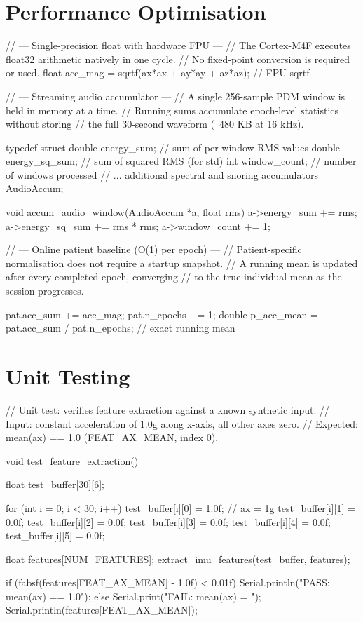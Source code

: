 \section{Performance Optimisation}
\label{app:optimisation}

\begin{ccode}
// --- Single-precision float with hardware FPU ---
// The Cortex-M4F executes float32 arithmetic natively in one cycle.
// No fixed-point conversion is required or used.
float acc_mag = sqrtf(ax*ax + ay*ay + az*az);   // FPU sqrtf

// --- Streaming audio accumulator ---
// A single 256-sample PDM window is held in memory at a time.
// Running sums accumulate epoch-level statistics without storing
// the full 30-second waveform (~480 KB at 16 kHz).

typedef struct {
    double energy_sum;     // sum of per-window RMS values
    double energy_sq_sum;  // sum of squared RMS (for std)
    int    window_count;   // number of windows processed
    // ... additional spectral and snoring accumulators
} AudioAccum;

void accum_audio_window(AudioAccum *a, float rms) {
    a->energy_sum    += rms;
    a->energy_sq_sum += rms * rms;
    a->window_count  += 1;
}

// --- Online patient baseline (O(1) per epoch) ---
// Patient-specific normalisation does not require a startup snapshot.
// A running mean is updated after every completed epoch, converging
// to the true individual mean as the session progresses.

pat.acc_sum  += acc_mag;
pat.n_epochs += 1;
double p_acc_mean = pat.acc_sum / pat.n_epochs;   // exact running mean
\end{ccode}


\section{Unit Testing}
\label{app:testing}

\begin{ccode}
// Unit test: verifies feature extraction against a known synthetic input.
// Input: constant acceleration of 1.0g along x-axis, all other axes zero.
// Expected: mean(ax) == 1.0 (FEAT_AX_MEAN, index 0).

void test_feature_extraction() {
    float test_buffer[30][6];

    for (int i = 0; i < 30; i++) {
        test_buffer[i][0] = 1.0f;   // ax = 1g
        test_buffer[i][1] = 0.0f;
        test_buffer[i][2] = 0.0f;
        test_buffer[i][3] = 0.0f;
        test_buffer[i][4] = 0.0f;
        test_buffer[i][5] = 0.0f;
    }

    float features[NUM_FEATURES];
    extract_imu_features(test_buffer, features);

    if (fabsf(features[FEAT_AX_MEAN] - 1.0f) < 0.01f) {
        Serial.println("PASS: mean(ax) == 1.0");
    } else {
        Serial.print("FAIL: mean(ax) = ");
        Serial.println(features[FEAT_AX_MEAN]);
    }
}
\end{ccode}
